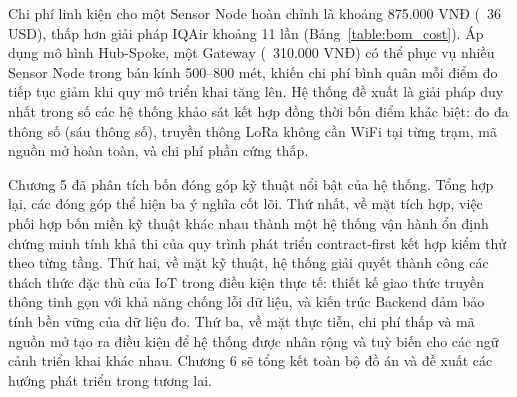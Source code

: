 \documentclass[../DoAn.tex]{subfiles}
\begin{document}
Chi phí linh kiện cho một Sensor Node hoàn chỉnh là khoảng 875.000 VNĐ (~36 USD), thấp hơn giải pháp IQAir khoảng 11 lần (Bảng~\ref{table:bom_cost}). Áp dụng mô hình Hub-Spoke, một Gateway (~310.000 VNĐ) có thể phục vụ nhiều Sensor Node trong bán kính 500–800 mét, khiến chi phí bình quân mỗi điểm đo tiếp tục giảm khi quy mô triển khai tăng lên. Hệ thống đề xuất là giải pháp duy nhất trong số các hệ thống khảo sát kết hợp đồng thời bốn điểm khác biệt: đo đa thông số (sáu thông số), truyền thông LoRa không cần WiFi tại từng trạm, mã nguồn mở hoàn toàn, và chi phí phần cứng thấp.

Chương 5 đã phân tích bốn đóng góp kỹ thuật nổi bật của hệ thống. Tổng hợp lại, các đóng góp thể hiện ba ý nghĩa cốt lõi. Thứ nhất, về mặt tích hợp, việc phối hợp bốn miền kỹ thuật khác nhau thành một hệ thống vận hành ổn định chứng minh tính khả thi của quy trình phát triển contract-first kết hợp kiểm thử theo từng tầng. Thứ hai, về mặt kỹ thuật, hệ thống giải quyết thành công các thách thức đặc thù của \gls{IoT} trong điều kiện thực tế: thiết kế giao thức truyền thông tinh gọn với khả năng chống lỗi dữ liệu, và kiến trúc Backend đảm bảo tính bền vững của dữ liệu đo. Thứ ba, về mặt thực tiễn, chi phí thấp và mã nguồn mở tạo ra điều kiện để hệ thống được nhân rộng và tuỳ biến cho các ngữ cảnh triển khai khác nhau. Chương 6 sẽ tổng kết toàn bộ đồ án và đề xuất các hướng phát triển trong tương lai.
\end{document}
